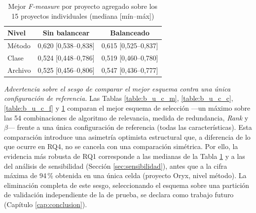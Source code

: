 \begin{table}[H]
\centering
\caption{Mejor \textit{F-measure} por proyecto agregado sobre los 15 proyectos individuales (mediana [mín--máx])}
\label{tab:agg}
\begin{tabular}{lcc}
\toprule
Nivel & Sin balancear & Balanceado \\
\midrule
Método  & 0,620 [0,538--0,838] & 0,615 [0,525--0,837] \\
Clase   & 0,524 [0,448--0,786] & 0,519 [0,460--0,780] \\
Archivo & 0,525 [0,456--0,806] & 0,547 [0,436--0,777] \\
\bottomrule
\end{tabular}
\end{table}

\textit{Advertencia sobre el sesgo de comparar el mejor esquema contra una única configuración de referencia.} Las Tablas \ref{table:b_u_c_m}, \ref{table:b_u_c_c}, \ref{table:b_u_c_f} y \ref{tab:agg} comparan el mejor esquema de selección ---un máximo sobre las 54 combinaciones de algoritmo de relevancia, medida de redundancia, \textit{Rank} y $\beta$--- frente a una única configuración de referencia (todas las características). Esta comparación introduce una asimetría optimista estructural que, a diferencia de lo que ocurre en RQ4, no se cancela con una comparación simétrica. Por ello, la evidencia más robusta de RQ1 corresponde a las medianas de la Tabla \ref{tab:agg} y a las del análisis de sensibilidad (Sección \ref{sec:sensibilidad}), antes que a la cifra máxima de 94\,\% obtenida en una única celda (proyecto Oryx, nivel método). La eliminación completa de este sesgo, seleccionando el esquema sobre una partición de validación independiente de la de prueba, se declara como trabajo futuro (Capítulo \ref{cap:conclusion}).


\noindent{}
\vspace{12pt}




